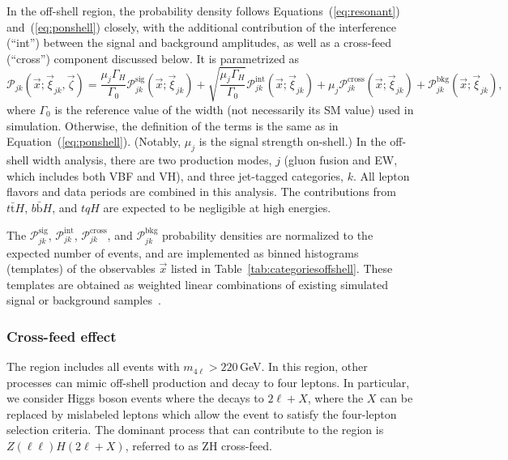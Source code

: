 In the off-shell region, the probability density follows Equations~(\ref{eq:resonant}) and~(\ref{eq:ponshell}) closely,
with the additional contribution of the interference (``int'') between the signal and background amplitudes,
as well as a cross-feed (``cross'') component discussed below. It is parametrized as 
\begin{equation}\label{eq:poffshell}
    \mathcal{P}_{jk}(\vec{x};\vec{\xi}_{jk},\vec\zeta) =
    \frac{\mu_j \Gamma_H}{\Gamma_0}\mathcal{P}_{jk}^\text{sig} ( \vec{x};\vec{\xi}_{jk})
    + \sqrt{\frac{\mu_j \Gamma_H}{\Gamma_0}}\mathcal{P}_{jk}^\mathrm{int} ( \vec{x};\vec{\xi}_{jk})
    + \mu_j\mathcal{P}_{jk}^\text{cross} (\vec{x};\vec{\xi}_{jk})
    + \mathcal{P}_{jk}^\text{bkg} ( \vec{x};\vec{\xi}_{jk}),
\end{equation}
where $\Gamma_0$ is the reference value of the \Hboson width (not necessarily its SM value)
used in simulation. Otherwise, the definition of the terms is the same as in Equation~(\ref{eq:ponshell}). (Notably, $\mu_j$ is the signal strength on-shell.) 
In the off-shell width analysis, there are two production modes, $j$ (gluon fusion and EW, which includes both VBF and VH), 
and three jet-tagged categories, $k$. All lepton flavors and data periods are combined in this analysis.
The contributions from $t\bar{\text{t}}H$, $b\bar{\text{b}}H$, and $tqH$ are expected to be negligible at high energies.

The $\mathcal{P}_{jk}^{\text{sig}}$, $\mathcal{P}_{jk}^{\text{int}}$, $\mathcal{P}_{jk}^{\text{cross}}$, and $\mathcal{P}_{jk}^\text{bkg}$ probability densities are normalized to the expected number of events, and are implemented as binned histograms (templates) of the observables $\vec{x}$ listed in Table~\ref{tab:categoriesoffshell}. These templates are obtained as weighted linear combinations of existing simulated signal or background samples~\cite{PhysRevD.111.092014}.

\subsubsection{Cross-feed effect}

The \offshell region includes all events with $m_{4\ell} > 220$\,GeV. In this region, other processes can mimic off-shell \Hboson production and decay to four leptons. In particular, we consider \onshell Higgs boson events where the \Hboson decays to $2\ell + X$, where the $X$ can be replaced by mislabeled leptons which allow the event to satisfy the four-lepton selection criteria. The dominant \onshell \Hboson process that can contribute to the \offshell region is $Z(\ell\ell)H(2\ell + X)$, referred to as ZH cross-feed.


